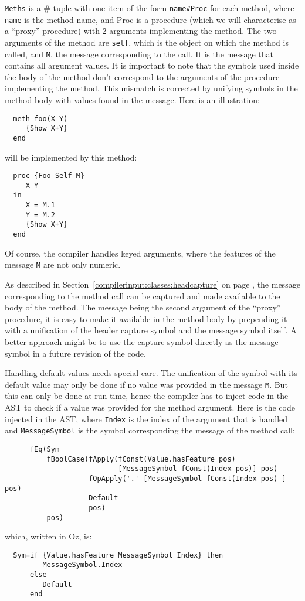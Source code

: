 \documentclass[a4paper]{memoir}
\begin{document}
\lstinline!Meths! is a \#-tuple with one item of the form \lstinline!name#Proc! for each
method, where \lstinline!name! is the method name, and Proc is a procedure
(which we will characterise as a ``proxy'' procedure) with
2 arguments implementing the method. The two arguments of the method are
\lstinline!self!,
which is the object on which the method is called, and \lstinline!M!, the message
corresponding to the call. It is the message that contains all argument values.
It is important to note that the symbols used inside the body of the method
don't correspond to the arguments of the procedure implementing the method.
This mismatch is corrected by unifying symbols in the method body with values
found in the message. Here is an illustration:
\begin{lstlisting}
  meth foo(X Y)
     {Show X+Y}
  end 
\end{lstlisting}
will be implemented by this method:
\begin{lstlisting}
  proc {Foo Self M}
     X Y
  in
     X = M.1
     Y = M.2
     {Show X+Y}
  end  
\end{lstlisting}
Of course, the compiler handles keyed arguments, where the features of the
message \lstinline!M! are not only numeric.

As described in Section~\ref{compilerinput:classes:headcapture} on page \pageref{compilerinput:classes:headcapture}, the message
corresponding to the method call can be captured and made available to the body of the
method. The message being the second argument of the ``proxy'' procedure, it is
easy to make it available in the method body by prepending it with a unification
of the header capture symbol and the message symbol itself. A better approach
might be to use the capture symbol directly as the message symbol in a future
revision of the code.

Handling default values needs special care. The unification of the symbol with its default value may only be done
if no value was provided in the message \lstinline!M!. But this can only be done at run time, hence the compiler
has to inject code in the AST to check if a value was provided for the method argument.
Here is the code injected in the AST, where \lstinline!Index! is the index of the argument that is handled and 
\lstinline!MessageSymbol! is the symbol corresponding the message of the method
call:
\begin{lstlisting}
      fEq(Sym 
          fBoolCase(fApply(fConst(Value.hasFeature pos) 
                           [MessageSymbol fConst(Index pos)] pos)
                    fOpApply('.' [MessageSymbol fConst(Index pos) ] pos)
                    Default 
                    pos) 
          pos)
\end{lstlisting}
which, written in Oz, is:
\begin{lstlisting}
  Sym=if {Value.hasFeature MessageSymbol Index} then 
         MessageSymbol.Index 
      else
         Default
      end
\end{lstlisting}
\end{document}
